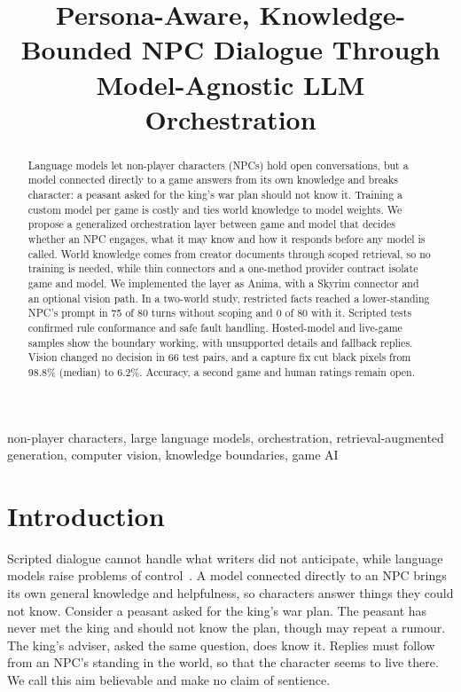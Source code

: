 \documentclass[conference]{IEEEtran}
\begin{document}
\title{Persona-Aware, Knowledge-Bounded NPC Dialogue Through Model-Agnostic LLM Orchestration}
\author{
}
\maketitle
\begin{abstract}
Language models let non-player characters (NPCs) hold open conversations, but a model connected directly to a game answers from its own knowledge and breaks character: a peasant asked for the king's war plan should not know it. Training a custom model per game is costly and ties world knowledge to model weights. We propose a generalized orchestration layer between game and model that decides whether an NPC engages, what it may know and how it responds before any model is called. World knowledge comes from creator documents through scoped retrieval, so no training is needed, while thin connectors and a one-method provider contract isolate game and model. We implemented the layer as Anima, with a Skyrim connector and an optional vision path. In a two-world study, restricted facts reached a lower-standing NPC's prompt in 75 of 80 turns without scoping and 0 of 80 with it. Scripted tests confirmed rule conformance and safe fault handling. Hosted-model and live-game samples show the boundary working, with unsupported details and fallback replies. Vision changed no decision in 66 test pairs, and a capture fix cut black pixels from 98.8\% (median) to 6.2\%. Accuracy, a second game and human ratings remain open.
\end{abstract}
\begin{IEEEkeywords}
non-player characters, large language models, orchestration, retrieval-augmented generation, computer vision, knowledge boundaries, game AI
\end{IEEEkeywords}

\section{Introduction}
Scripted dialogue cannot handle what writers did not anticipate, while language models raise problems of control~\cite{gallotta2024}. A model connected directly to an NPC brings its own general knowledge and helpfulness, so characters answer things they could not know. Consider a peasant asked for the king's war plan. The peasant has never met the king and should not know the plan, though may repeat a rumour. The king's adviser, asked the same question, does know it. Replies must follow from an NPC's standing in the world, so that the character seems to live there. We call this aim believable and make no claim of sentience.
\end{document}
